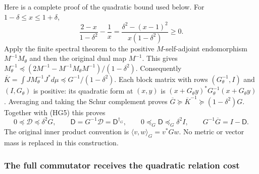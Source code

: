 Here is a complete proof of the quadratic bound used below. For
$1-\delta\le x\le1+\delta$,
\[
 \frac{2-x}{1-\delta^2}-\frac1x
 =\frac{\delta^2-(x-1)^2}{x(1-\delta^2)}\ge0 .
 \tag{HG6}
\]
Apply the finite spectral theorem to the positive $M$-self-adjoint
endomorphism $M^{-1}M_\theta$ and then the original dual map $M^{-1}$.
This gives
$M_\theta^{-1}\preceq
(2M^{-1}-M^{-1}M_\theta M^{-1})/(1-\delta^2)$.
Consequently $\overline K=\int JM_\theta^{-1}J^*d\mu
\preceq G^{-1}/(1-\delta^2)$.
Each block matrix with rows $(G_\theta^{-1},I)$ and $(I,G_\theta)$
is positive: its quadratic form at $(x,y)$ is
$(x+G_\theta y)^*G_\theta^{-1}(x+G_\theta y)$.
Averaging and taking the Schur complement proves
$\overline G\succeq\overline K^{-1}\succeq(1-\delta^2)G$.
Together with (HG5) this proves
\[
 0\preceq\mathscr D\preceq\delta^2G,\qquad
 \mathsf D=G^{-1}\mathscr D=\mathsf D^{\dagger_G},\qquad
 0\preceq_G\mathsf D\preceq_G\delta^2I,\qquad
 G^{-1}\overline G=I-\mathsf D .
 \tag{HG7}
\]
The original inner product convention is $\langle v,w\rangle_G=v^*Gw$.
No metric or vector mass is replaced in this construction.

\subsubsection{The full commutator receives the quadratic relation cost}

